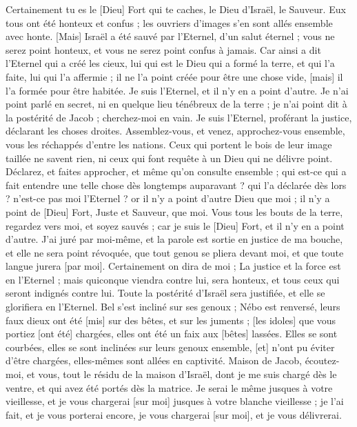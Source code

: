 \begin{multicols}{2}
Certainement tu es le [Dieu] Fort qui te caches, le Dieu d'Israël, le Sauveur.
Eux tous ont été honteux et confus ; les ouvriers d'images s'en sont allés ensemble avec honte.
[Mais] Israël a été sauvé par l'Eternel, d'un salut éternel ; vous ne serez point honteux, et vous ne serez point confus à jamais.
Car ainsi a dit l'Eternel qui a créé les cieux, lui qui est le Dieu qui a formé la terre, et qui l'a faite, lui qui l'a affermie ; il ne l'a point créée pour être une chose vide, [mais] il l'a formée pour être habitée. Je suis l'Eternel, et il n'y en a point d'autre.
Je n'ai point parlé en secret, ni en quelque lieu ténébreux de la terre ; je n'ai point dit à la postérité de Jacob ; cherchez-moi en vain. Je suis l'Eternel, proférant la justice, déclarant les choses droites.
Assemblez-vous, et venez, approchez-vous ensemble, vous les réchappés d'entre les nations. Ceux qui portent le bois de leur image taillée ne savent rien, ni ceux qui font requête à un Dieu qui ne délivre point.
Déclarez, et faites approcher, et même qu'on consulte ensemble ; qui est-ce qui a fait entendre une telle chose dès longtemps auparavant ? qui l'a déclarée dès lors ? n'est-ce pas moi l'Eternel ? or il n'y a point d'autre Dieu que moi ; il n'y a point de [Dieu] Fort, Juste et Sauveur, que moi.
Vous tous les bouts de la terre, regardez vers moi, et soyez sauvés ; car je suis le [Dieu] Fort, et il n'y en a point d'autre.
J'ai juré par moi-même, et la parole est sortie en justice de ma bouche, et elle ne sera point révoquée, que tout genou se pliera devant moi, et que toute langue jurera [par moi].
Certainement on dira de moi ; La justice et la force est en l'Eternel ; mais quiconque viendra contre lui, sera honteux, et tous ceux qui seront indignés contre lui.
Toute la postérité d'Israël sera justifiée, et elle se glorifiera en l'Eternel.
\VerseOne{}Bel s'est incliné sur ses genoux ; Nébo est renversé, leurs faux dieux ont été [mis] sur des bêtes, et sur les juments ; [les idoles] que vous portiez [ont été] chargées, elles ont été un faix aux [bêtes] lassées.
Elles se sont courbées, elles se sont inclinées sur leurs genoux ensemble, [et] n'ont pu éviter d'être chargées, elles-mêmes sont allées en captivité.
Maison de Jacob, écoutez-moi, et vous, tout le résidu de la maison d'Israël, dont je me suis chargé dès le ventre, et qui avez été portés dès la matrice.
Je serai le même jusques à votre vieillesse, et je vous chargerai [sur moi] jusques à votre blanche vieillesse ; je l'ai fait, et je vous porterai encore, je vous chargerai [sur moi], et je vous délivrerai.

\end{multicols}
